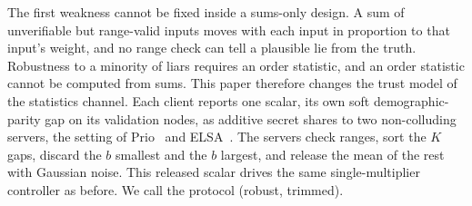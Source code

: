 The first weakness cannot be fixed inside a sums-only design. A sum of unverifiable but range-valid inputs moves with each input in proportion to that input's weight, and no range check can tell a plausible lie from the truth. Robustness to a minority of liars requires an order statistic, and an order statistic cannot be computed from sums. This paper therefore changes the trust model of the statistics channel. Each client reports one scalar, its own soft demographic-parity gap on its validation nodes, as additive secret shares to two non-colluding servers, the setting of Prio~\citep{corrigangibbs2017prio} and ELSA~\citep{rathee2023elsa}. The servers check ranges, sort the $K$ gaps, discard the $b$ smallest and the $b$ largest, and release the mean of the rest with Gaussian noise. This released scalar drives the same single-multiplier controller as before. We call the protocol \rt{} (robust, trimmed).

